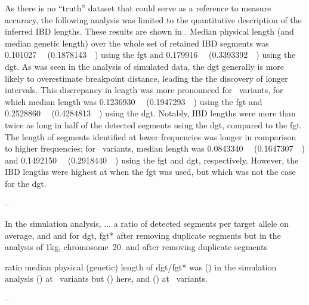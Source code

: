 %

%

As there is no ``truth'' dataset that could serve as a reference to measure accuracy, the following analysis was limited to the quantitative description of the inferred IBD lengths.
These results are shown in .
Median physical length (and median genetic length) over the whole set of retained IBD segments was
\SI{0.101027}{\mega\basepair} (\SI{0.1878143}{\centi\morgan}) using the \gls{fgt} and
\SI{0.179916}{\mega\basepair} (\SI{0.3393392}{\centi\morgan}) using the \gls{dgt}.
As was seen in the analysis of simulated data, the \gls{dgt} generally is more likely to overestimate breakpoint distance, leading the the discovery of longer intervals.
This discrepancy in length was more pronounced for ~variants, for which median length was
\SI{0.1236930}{\mega\basepair} (\SI{0.1947293}{\centi\morgan}) using the \gls{fgt} and
\SI{0.2528860}{\mega\basepair} (\SI{0.4284813}{\centi\morgan}) using the \gls{dgt}.
Notably, IBD lengths were more than twice as long in half of the detected segments using the \gls{dgt}, compared to the \gls{fgt}.
The length of segments identified at lower frequencies was longer in comparison to higher frequencies; \eg for ~variants, median length was
\SI{0.0843340}{\mega\basepair} (\SI{0.1647307}{\centi\morgan}) and
\SI{0.1492150}{\mega\basepair} (\SI{0.2918440}{\centi\morgan}) using the \gls{fgt} and \gls{dgt}, respectively.
However, the IBD lengths were highest at \fk{[3,5]} when the \gls{fgt} was used, but which was not the case for the \gls{dgt}.



--

In the simulation analysis, ...
a ratio of  detected segments per target allele on average,
and  and  for dgt, fgt* after removing duplicate segments
but  in the analysis of \gls{1kg}, chromosome~20.
and \dec{} after removing duplicate segments

ratio median physical (genetic) length of dgt/fgt* was  () in the simulation analysis
 () at ~variants
but  () here, and  () at ~variants.

--



